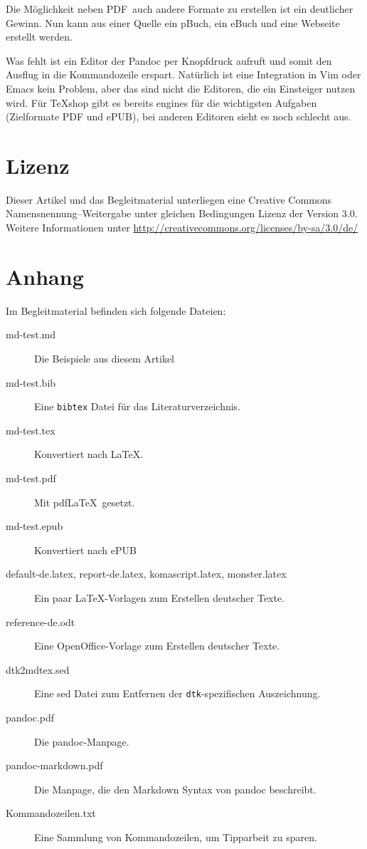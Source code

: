 \documentclass[11pt,ngerman,a4paper]{article}
\begin{document}
Die Möglichkeit neben PDF~auch andere Formate zu erstellen ist ein
deutlicher Gewinn. Nun kann aus einer Quelle ein pBuch, ein eBuch und
eine Webseite erstellt werden.

Was fehlt ist ein Editor der Pandoc per Knopfdruck aufruft und somit den
Ausflug in die Kommandozeile erspart. Natürlich ist eine Integration in
Vim oder Emacs kein Problem, aber das sind nicht die Editoren, die ein
Einsteiger nutzen wird. Für TeXshop gibt es bereits engines für die
wichtigsten Aufgaben (Zielformate PDF und ePUB), bei anderen Editoren
sieht es noch schlecht aus.

\section{Lizenz}\label{lizenz}

Dieser Artikel und das Begleitmaterial unterliegen eine Creative Commons
Namensnennung--Weitergabe unter gleichen Bedingungen Lizenz der Version
3.0. Weitere Informationen unter
\url{http://creativecommons.org/licenses/by-sa/3.0/de/}

\section{Anhang}\label{anhang}

Im Begleitmaterial befinden sich folgende Dateien:

\begin{description}
\item[md-test.md]
Die Beispiele aus diesem Artikel
\item[md-test.bib]
Eine \texttt{bibtex} Datei für das Literaturverzeichnis.
\item[md-test.tex]
Konvertiert nach LaTeX.
\item[md-test.pdf]
Mit pdfLaTeX~gesetzt.
\item[md-test.epub]
Konvertiert nach ePUB
\item[default-de.latex, report-de.latex, komascript.latex,
monster.latex]
Ein paar LaTeX-Vorlagen zum Erstellen deutscher Texte.
\item[reference-de.odt]
Eine OpenOffice-Vorlage zum Erstellen deutscher Texte.
\item[dtk2mdtex.sed]
Eine sed Datei zum Entfernen der \texttt{dtk}-spezifischen Auszeichnung.
\item[pandoc.pdf]
Die pandoc-Manpage.
\item[pandoc-markdown.pdf]
Die Manpage, die den Markdown Syntax von pandoc beschreibt.
\item[Kommandozeilen.txt]
Eine Sammlung von Kommandozeilen, um Tipparbeit zu sparen.
\end{description}

\printbibliography[title=Literaturverzeichnis]
\end{document}
